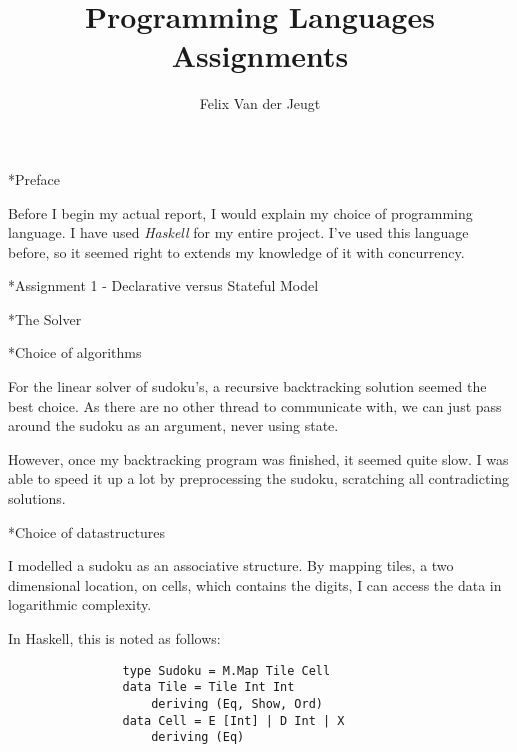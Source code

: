 \documentclass[a4paper,12pt]{article}
\author{Felix Van der Jeugt}
\title{
    Programming Languages Assignments
}
\begin{document}
\maketitle



\begin{section}*{Preface}

    Before I begin my actual report, I would explain my choice of programming
    language. I have used \textit{Haskell} for my entire project. I've used
    this language before, so it seemed right to extends my knowledge of it with
    concurrency.

\end{section}


\begin{section}*{Assignment 1 - Declarative versus Stateful Model}


    \begin{subsection}*{The Solver}


        \begin{subsubsection}*{Choice of algorithms}

            For the linear solver of sudoku's, a recursive backtracking solution seemed the
            best choice. As there are no other thread to communicate with, we can just pass
            around the sudoku as an argument, never using state.

            However, once my backtracking program was finished, it seemed quite slow. I
            was able to speed it up a lot by preprocessing the sudoku, scratching all
            contradicting solutions.

        \end{subsubsection}


        \begin{subsubsection}*{Choice of datastructures}

            I modelled a sudoku as an associative structure. By mapping tiles, a two
            dimensional location, on cells, which contains the digits, I can access the data
            in logarithmic complexity.

            In Haskell, this is noted as follows:

            \begin{lstlisting}
                type Sudoku = M.Map Tile Cell
                data Tile = Tile Int Int
                    deriving (Eq, Show, Ord)
                data Cell = E [Int] | D Int | X
                    deriving (Eq)
            \end{lstlisting}


\end{subsubsection}
\end{subsection}
\end{section}
\end{document}
